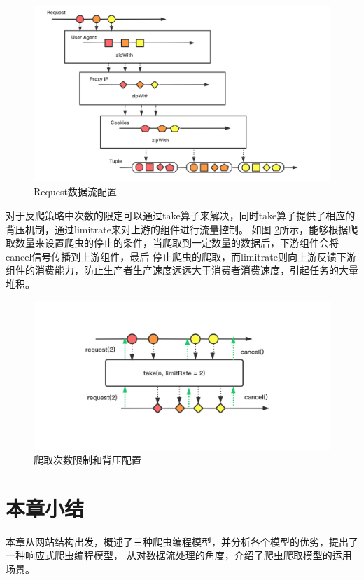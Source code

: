 \documentclass[master]{njuthesis}
\begin{document}
\begin{figure}[htbp]
\centering
\includegraphics[width= 1\textwidth]{pic/reactive-zip.png}
\caption{Request数据流配置}\label{fig:zip}
\end{figure}


对于反爬策略中次数的限定可以通过take算子来解决，同时take算子提供了相应的背压机制，通过limitrate来对上游的组件进行流量控制。
如图 \ref{fig:take}所示，能够根据爬取数量来设置爬虫的停止的条件，当爬取到一定数量的数据后，下游组件会将cancel信号传播到上游组件，最后
停止爬虫的爬取，而limitrate则向上游反馈下游组件的消费能力，防止生产者生产速度远远大于消费者消费速度，引起任务的大量堆积。

\begin{figure}[htbp]
\centering
\includegraphics[width= 1\textwidth]{pic/reactive-take.png}
\caption{爬取次数限制和背压配置}\label{fig:take}
\end{figure}


\section{本章小结}
本章从网站结构出发，概述了三种爬虫编程模型，并分析各个模型的优劣，提出了一种响应式爬虫编程模型，
从对数据流处理的角度，介绍了爬虫爬取模型的运用场景。
\end{document}
